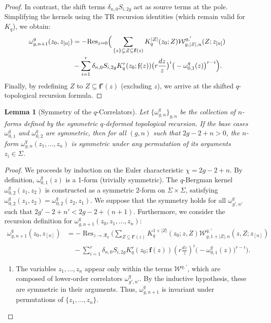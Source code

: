 \documentclass[reqno,11pt]{amsart}
\theoremstyle{plain}
\newtheorem{lemma}[theorem]{Lemma}
\theoremstyle{definition}
\theoremstyle{remark}
\numberwithin{equation}{section}
\newcommand{\mf}[1]{\mathfrak{#1}}
\newcommand{\1}{\mathds{1}}
\newcommand{\2}{\frac{1}{2}}
\DeclareMathOperator*{\Res}{Res}
\begin{document}
{\begin{proof}
									In contrast, the shift terms $\delta_{n,0}S_{i,2g}$ act as source terms at the pole. Simplifying the kernels using the  TR recursion identities (which remain valid for $K_q$), we obtain:
									\begin{align}
										\omega^q_{g,n+1}(z_0, z_{[n]}) 
										&=
										-{\rm Res}_{z = 0 } \Big( \sum_{ \{ z\} \subsetneq Z \subseteq \mathbf{f}(z)} K_q^{|Z|}(z_0; Z)\mathcal{W}^{q,'}_{g,|Z|,n} (Z; z_{[n]})\nonumber
										\\
										&-
										\sum_{i=1}^{r}\delta_{n,0} S_{i,2g} K^r_q(z_0; \mf{f}(z)) \big( r\frac{dz}{z} \big)^{i} \big( - \omega^{q}_{0,1}(z)\big)^{r-i}\Big).
									\end{align}
									Finally,  by redefining $Z$ to $Z \subseteq \mathbf{f}'(z)$ (excluding $z$), we arrive at the shifted $q$-topological recursion formula.
								\end{proof}
								\begin{lemma}[Symmetry of the $q$-Correlators]
									Let $\{\omega^{q}_{g,n}\}_{g,n}$ be the collection of $n$-forms defined by the symmetric $q$-deformed topological recursion. If the base cases $\omega^{q}_{0,1}$ and $\omega^{q}_{0,2}$ are symmetric, then for all $(g,n)$ such that $2g-2+n > 0$, the $n$-form $\omega^{q}_{g,n}(z_1, \dots, z_n)$ is symmetric under any permutation of its arguments $z_i \in \Sigma$.
								\end{lemma}
								\begin{proof}
									We proceeds by induction on the Euler characteristic $\chi = 2g-2+n$.
									By definition, $\omega^{q}_{0,1}(z)$ is a 1-form (trivially symmetric). The $q$-Bergman kernel $\omega^{q}_{0,2}(z_1, z_2)$ is constructed as a symmetric 2-form on $\Sigma \times \Sigma$, satisfying $\omega^{q}_{0,2}(z_1, z_2) = \omega^{q}_{0,2}(z_2, z_1)$.
									We suppose that the symmetry holds for all $\omega^{q}_{g',n'}$ such that $2g'-2+n' < 2g-2+(n+1)$. Furthermore, we consider the recursion definition for $\omega^{q}_{g,n+1}(z_0, z_1, \dots, z_n)$:
									\begin{align*}
										\omega^{q}_{g,n+1}(z_0, z_{[n]}) &= -\Res_{z \to \mathcal{R}_q} \Big( \sum_{Z \subseteq \mathbf{f}' (z)} K^{1 + |Z|}_q(z_0; z, Z) \mathcal{W}^{q,'}_{g,1+|Z|,n} (z,Z; z_{[n]}) \\
										&\quad - \sum_{i=1}^{r}\delta_{n,0} S_{i,2g} K^r_q(z_0; \mathbf{f}(z)) \left( r\frac{dz}{z} \right)^{i} \big( - \omega^{q}_{0,1}(z)\big)^{r-i}\Big).
									\end{align*}
									\begin{enumerate}
										\item  The variables $z_1, \dots, z_n$ appear only within the terms $\mathcal{W}^{q,'}$, which are composed of lower-order correlators $\omega^q_{g',n'}$. By the inductive hypothesis, these are symmetric in their arguments. Thus, $\omega^{q}_{g,n+1}$ is invariant under permutations of $\{z_1, \dots, z_n\}$.
										

\end{enumerate}
\end{proof}}
\end{document}
